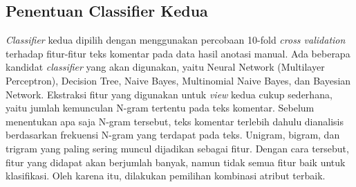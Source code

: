 	\subsection{Penentuan Classifier Kedua}
	\textit{Classifier} kedua dipilih dengan menggunakan percobaan 10-fold \textit{cross validation} terhadap fitur-fitur teks komentar pada data hasil anotasi manual. Ada beberapa kandidat \textit{classifier} yang akan digunakan, yaitu Neural Network (Multilayer Perceptron), Decision Tree, Naive Bayes, Multinomial Naive Bayes, dan Bayesian Network. 
	Ekstraksi fitur yang digunakan untuk \textit{view} kedua cukup sederhana, yaitu jumlah kemunculan N-gram tertentu pada teks komentar. Sebelum menentukan apa saja N-gram tersebut, teks komentar terlebih dahulu dianalisis berdasarkan frekuensi N-gram yang terdapat pada teks. Unigram, bigram, dan trigram yang paling sering muncul dijadikan sebagai fitur. Dengan cara tersebut, fitur yang didapat akan berjumlah banyak, namun tidak semua fitur baik untuk klasifikasi. Oleh karena itu, dilakukan pemilihan kombinasi atribut terbaik.
